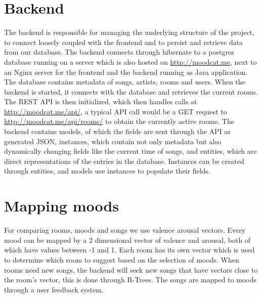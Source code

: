 \section{Backend}
The backend is responsible for managing the underlying structure of the project, to
connect loosely coupled with the frontend and to persist and retrieve data from our database.
The backend connects through hibernate to a postgres database running on a server which is also hosted on \url{http://moodcat.me}, next to an Nginx server for the
frontend and the backend running as Java application. The database contains metadata of songs, artists, rooms and users. When the
backend is started, it connects with the database and retrieves the current rooms. The REST API is then initialized, which then
handles calls at \url{http://moodcat.me/api/}, a typical API call would be a GET request to \url{http://moodcat.me/api/rooms/} to obtain the currently
active rooms.
The backend contains models, of which the fields are sent through the API as generated JSON, instances, which contain not only metadata but also
dynamically changing fields like the current time of songs, and entities, which are direct representations of the entries in the database.
Instances can be created through entities, and models use instances to populate their fields.

\section{Mapping moods}
For comparing rooms, moods and songs we use valence arousal vectors. Every mood can be mapped by a 2 dimensional vector of valence and arousal,
both of which have values between -1 and 1. Each room has its own vector which is used to determine which room to suggest based on
the selection of moods. When rooms need new songs, the backend will seek new songs that have vectors close to the room's vector, this is done
through R-Trees.
The songs are mapped to moods through a user feedback system.
